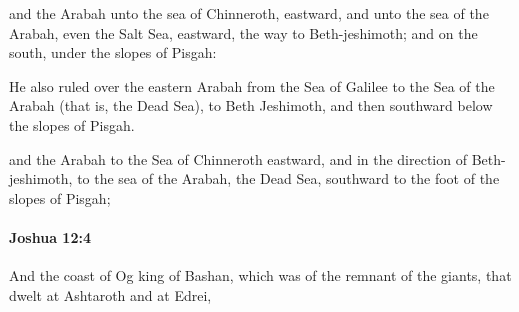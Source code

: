 			\begin{versebox}
					\item[BHS] 
					\item[ASV] and the Arabah unto the sea of Chinneroth, eastward, and unto the sea of the Arabah, even the Salt Sea, eastward, the way to Beth-jeshimoth; and on the south, under the slopes of Pisgah:
					\item[NIV] He also ruled over the eastern Arabah from the Sea of Galilee to the Sea of the Arabah (that is, the Dead Sea), to Beth Jeshimoth, and then southward below the slopes of Pisgah.
					\item[NRSV] and the Arabah to the Sea of Chinneroth eastward, and in the direction of Beth-jeshimoth, to the sea of the Arabah, the Dead Sea, southward to the foot of the slopes of Pisgah;
			\end{versebox}

		\paragraph{Joshua 12:4} %
			\label{JOSHUA-12-4}

			And the coast of Og king of Bashan, which was of the remnant of the giants, that dwelt at Ashtaroth and at Edrei,

